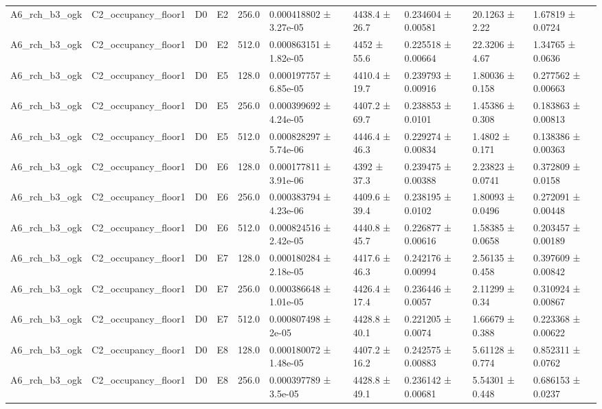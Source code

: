 \begin{table}
\begin{tabular}{llllllllll}
A6\_rch\_b3\_ogk & C2\_occupancy\_floor1 & D0 & E2 & 256.0 & 0.000418802 ± 3.27e-05 & 4438.4 ± 26.7 & 0.234604 ± 0.00581 & 20.1263 ± 2.22 & 1.67819 ± 0.0724 \\
A6\_rch\_b3\_ogk & C2\_occupancy\_floor1 & D0 & E2 & 512.0 & 0.000863151 ± 1.82e-05 & 4452 ± 55.6 & 0.225518 ± 0.00664 & 22.3206 ± 4.67 & 1.34765 ± 0.0636 \\
A6\_rch\_b3\_ogk & C2\_occupancy\_floor1 & D0 & E5 & 128.0 & 0.000197757 ± 6.85e-05 & 4410.4 ± 19.7 & 0.239793 ± 0.00916 & 1.80036 ± 0.158 & 0.277562 ± 0.00663 \\
A6\_rch\_b3\_ogk & C2\_occupancy\_floor1 & D0 & E5 & 256.0 & 0.000399692 ± 4.24e-05 & 4407.2 ± 69.7 & 0.238853 ± 0.0101 & 1.45386 ± 0.308 & 0.183863 ± 0.00813 \\
A6\_rch\_b3\_ogk & C2\_occupancy\_floor1 & D0 & E5 & 512.0 & 0.000828297 ± 5.74e-06 & 4446.4 ± 46.3 & 0.229274 ± 0.00834 & 1.4802 ± 0.171 & 0.138386 ± 0.00363 \\
A6\_rch\_b3\_ogk & C2\_occupancy\_floor1 & D0 & E6 & 128.0 & 0.000177811 ± 3.91e-06 & 4392 ± 37.3 & 0.239475 ± 0.00388 & 2.23823 ± 0.0741 & 0.372809 ± 0.0158 \\
A6\_rch\_b3\_ogk & C2\_occupancy\_floor1 & D0 & E6 & 256.0 & 0.000383794 ± 4.23e-06 & 4409.6 ± 39.4 & 0.238195 ± 0.0102 & 1.80093 ± 0.0496 & 0.272091 ± 0.00448 \\
A6\_rch\_b3\_ogk & C2\_occupancy\_floor1 & D0 & E6 & 512.0 & 0.000824516 ± 2.42e-05 & 4440.8 ± 45.7 & 0.226877 ± 0.00616 & 1.58385 ± 0.0658 & 0.203457 ± 0.00189 \\
A6\_rch\_b3\_ogk & C2\_occupancy\_floor1 & D0 & E7 & 128.0 & 0.000180284 ± 2.18e-05 & 4417.6 ± 46.3 & 0.242176 ± 0.00994 & 2.56135 ± 0.458 & 0.397609 ± 0.00842 \\
A6\_rch\_b3\_ogk & C2\_occupancy\_floor1 & D0 & E7 & 256.0 & 0.000386648 ± 1.01e-05 & 4426.4 ± 17.4 & 0.236446 ± 0.0057 & 2.11299 ± 0.34 & 0.310924 ± 0.00867 \\
A6\_rch\_b3\_ogk & C2\_occupancy\_floor1 & D0 & E7 & 512.0 & 0.000807498 ± 2e-05 & 4428.8 ± 40.1 & 0.221205 ± 0.0074 & 1.66679 ± 0.388 & 0.223368 ± 0.00622 \\
A6\_rch\_b3\_ogk & C2\_occupancy\_floor1 & D0 & E8 & 128.0 & 0.000180072 ± 1.48e-05 & 4407.2 ± 16.2 & 0.242575 ± 0.00883 & 5.61128 ± 0.774 & 0.852311 ± 0.0762 \\
A6\_rch\_b3\_ogk & C2\_occupancy\_floor1 & D0 & E8 & 256.0 & 0.000397789 ± 3.5e-05 & 4428.8 ± 49.1 & 0.236142 ± 0.00681 & 5.54301 ± 0.448 & 0.686153 ± 0.0237 \\

\end{tabular}
\end{table}
